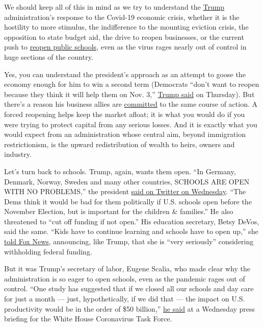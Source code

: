 We should keep all of this in mind as we try to understand the
\href{https://www.nytimes.com/2020/07/10/us/politics/trump-schools-reopening.html}{Trump}
administration's response to the Covid-19 economic crisis, whether it is
the hostility to more stimulus, the indifference to the mounting
eviction crisis, the opposition to state budget aid, the drive to reopen
businesses, or the current push to
\href{https://www.nytimes.com/2020/07/10/us/politics/trump-schools-reopening.html}{reopen
public schools}, even as the virus rages nearly out of control in huge
sections of the country.

Yes, you can understand the president's approach as an attempt to goose
the economy enough for him to win a second term (Democrats ``don't want
to reopen because they think it will help them on Nov. 3,''
\href{https://twitter.com/joshtpm/status/1281320469921136641?s=21}{Trump
said} on Thursday). But there's a reason his business allies are
\href{https://apnews.com/57f673f31fb343042e3806b9806e8f7d}{committed} to
the same course of action. A forced reopening helps keep the market
afloat; it is what you would do if you were trying to protect capital
from any serious losses. And it is exactly what you would expect from an
administration whose central aim, beyond immigration restrictionism, is
the upward redistribution of wealth to heirs, owners and industry.

Let's turn back to schools. Trump, again, wants them open. ``In Germany,
Denmark, Norway, Sweden and many other countries, SCHOOLS ARE OPEN WITH
NO PROBLEMS,'' the president
\href{https://twitter.com/realdonaldtrump/status/1280853299600789505?s=21}{said
on Twitter on Wednesday}. ``The Dems think it would be bad for them
politically if U.S. schools open before the November Election, but is
important for the children \& families.'' He also threatened to ``cut
off funding if not open.'' His education secretary, Betsy DeVos, said
the same. ``Kids have to continue learning and schools have to open
up,'' she
\href{https://thehill.com/homenews/administration/506427-devos-very-seriously-considering-withholding-funding-from-schools}{told
Fox News}, announcing, like Trump, that she is ``very seriously''
considering withholding federal funding.

But it was Trump's secretary of labor, Eugene Scalia, who made clear why
the administration is so eager to open schools, even as the pandemic
rages out of control. ``One study has suggested that if we closed all
our schools and day care for just a month --- just, hypothetically, if
we did that --- the impact on U.S. productivity would be in the order of
\$50 billion,''
\href{https://www.whitehouse.gov/briefings-statements/press-briefing-vice-president-pence-members-coronavirus-task-force-july-8-2020/}{he
said} at a Wednesday press briefing for the White House Coronavirus Task
Force.

